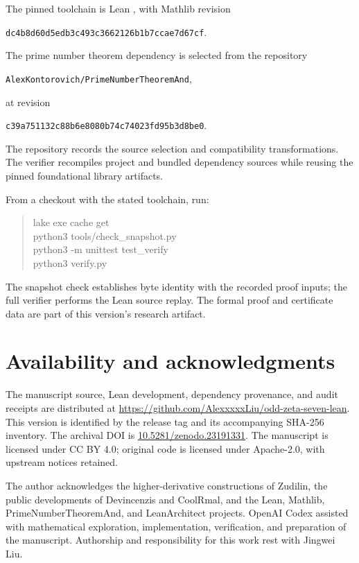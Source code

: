 \documentclass[11pt]{article}
\newcommand{\code}[1]{\texttt{\small\detokenize{#1}}}
\begin{document}
The pinned toolchain is Lean \code{v4.34.0-rc2}, with Mathlib revision
\begin{center}\small\texttt{dc4b8d60d5edb3c493c3662126b1b7ccae7d67cf}.\end{center}
The prime number theorem dependency is selected from the repository
\begin{center}\small\texttt{AlexKontorovich/PrimeNumberTheoremAnd},\end{center}
at revision
\begin{center}\small\texttt{c39a751132c88b6e8080b74c74023fd95b3d8be0}.\end{center}
The repository records the source selection and compatibility transformations.
The verifier recompiles project and bundled dependency sources while reusing
the pinned foundational library artifacts.

From a checkout with the stated toolchain, run:
\begin{quote}\ttfamily\small
lake exe cache get\\
python3 tools/check\_snapshot.py\\
python3 -m unittest test\_verify\\
python3 verify.py
\end{quote}
The snapshot check establishes byte identity with the recorded proof inputs;
the full verifier performs the Lean source replay. The formal proof and
certificate data are part of this version's research artifact.

\clearpage
\section*{Availability and acknowledgments}
The manuscript source, Lean development, dependency provenance, and audit
receipts are distributed at
\url{https://github.com/AlexxxxxLiu/odd-zeta-seven-lean}.
This version is identified by the release tag \code{v1.0.0} and its
accompanying SHA-256 inventory.
The archival DOI is \href{https://doi.org/10.5281/zenodo.23191331}
{10.5281/zenodo.23191331}. The manuscript is licensed under CC BY 4.0;
original code is licensed under Apache-2.0, with upstream notices retained.

The author acknowledges the higher-derivative constructions of Zudilin,
the public developments of Devincenzis and CoolRmal, and the Lean, Mathlib,
PrimeNumberTheoremAnd, and LeanArchitect projects. OpenAI Codex assisted
with mathematical exploration, implementation, verification, and preparation
of the manuscript. Authorship and responsibility for this work rest with
Jingwei Liu.
\end{document}
